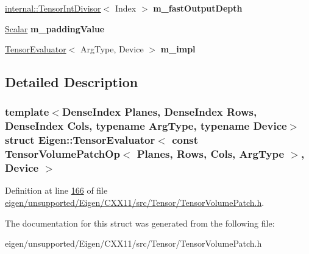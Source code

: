 \begin{DoxyCompactItemize}
\hyperlink{struct_eigen_1_1internal_1_1_tensor_int_divisor}{internal\+::\+Tensor\+Int\+Divisor}$<$ Index $>$ {\bfseries m\+\_\+fast\+Output\+Depth}
\item 
\mbox{\label{struct_eigen_1_1_tensor_evaluator_3_01const_01_tensor_volume_patch_op_3_01_planes_00_01_rows_00_7868d50e868058a145e213ecbb5a830e_ab5af7e7b078399758dd9df1de60ec7b3}} 
\hyperlink{group___sparse_core___module}{Scalar} {\bfseries m\+\_\+padding\+Value}
\item 
\mbox{\label{struct_eigen_1_1_tensor_evaluator_3_01const_01_tensor_volume_patch_op_3_01_planes_00_01_rows_00_7868d50e868058a145e213ecbb5a830e_ace53966fc210071f6448a8820f3fc86c}} 
\hyperlink{struct_eigen_1_1_tensor_evaluator}{Tensor\+Evaluator}$<$ Arg\+Type, Device $>$ {\bfseries m\+\_\+impl}
\end{DoxyCompactItemize}


\subsection{Detailed Description}
\subsubsection*{template$<$Dense\+Index Planes, Dense\+Index Rows, Dense\+Index Cols, typename Arg\+Type, typename Device$>$\newline
struct Eigen\+::\+Tensor\+Evaluator$<$ const Tensor\+Volume\+Patch\+Op$<$ Planes, Rows, Cols, Arg\+Type $>$, Device $>$}



Definition at line \hyperlink{eigen_2unsupported_2_eigen_2_c_x_x11_2src_2_tensor_2_tensor_volume_patch_8h_source_l00166}{166} of file \hyperlink{eigen_2unsupported_2_eigen_2_c_x_x11_2src_2_tensor_2_tensor_volume_patch_8h_source}{eigen/unsupported/\+Eigen/\+C\+X\+X11/src/\+Tensor/\+Tensor\+Volume\+Patch.\+h}.



The documentation for this struct was generated from the following file\+:\begin{DoxyCompactItemize}
\item 
eigen/unsupported/\+Eigen/\+C\+X\+X11/src/\+Tensor/\+Tensor\+Volume\+Patch.\+h\end{DoxyCompactItemize}
